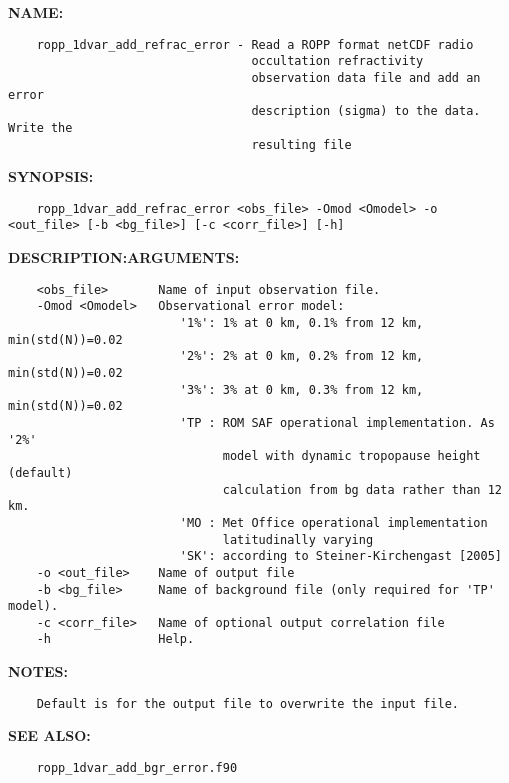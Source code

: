 \label{ch:robo44}
\label{ch:Programs_ropp_1dvar_add_refrac_error}
\textbf{NAME:}\hspace{0.08in}\begin{Verbatim}
    ropp_1dvar_add_refrac_error - Read a ROPP format netCDF radio
                                  occultation refractivity
                                  observation data file and add an error
                                  description (sigma) to the data. Write the
                                  resulting file
\end{Verbatim}
\textbf{SYNOPSIS:}\hspace{0.08in}\begin{Verbatim}
    ropp_1dvar_add_refrac_error <obs_file> -Omod <Omodel> -o <out_file> [-b <bg_file>] [-c <corr_file>] [-h]
\end{Verbatim}
\textbf{DESCRIPTION:}\hspace{0.08in}\textbf{ARGUMENTS:}\hspace{0.08in}\begin{Verbatim}
    <obs_file>       Name of input observation file.
    -Omod <Omodel>   Observational error model:
                        '1%': 1% at 0 km, 0.1% from 12 km, min(std(N))=0.02
                        '2%': 2% at 0 km, 0.2% from 12 km, min(std(N))=0.02
                        '3%': 3% at 0 km, 0.3% from 12 km, min(std(N))=0.02
                        'TP : ROM SAF operational implementation. As '2%'
                              model with dynamic tropopause height (default)
                              calculation from bg data rather than 12 km.
                        'MO : Met Office operational implementation
                              latitudinally varying
                        'SK': according to Steiner-Kirchengast [2005]
    -o <out_file>    Name of output file
    -b <bg_file>     Name of background file (only required for 'TP' model).
    -c <corr_file>   Name of optional output correlation file
    -h               Help.
\end{Verbatim}
\textbf{NOTES:}\hspace{0.08in}\begin{Verbatim}
    Default is for the output file to overwrite the input file.
\end{Verbatim}
\textbf{SEE ALSO:}\hspace{0.08in}\begin{Verbatim}
    ropp_1dvar_add_bgr_error.f90
\end{Verbatim}
